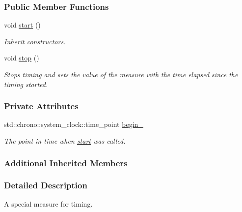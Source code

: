 \subsubsection*{Public Member Functions}
\begin{DoxyCompactItemize}
\item 
void \hyperlink{structslb_1_1core_1_1sb_1_1Timer_a93e96781fce89281c439f6d536e4011b}{start} ()
\begin{DoxyCompactList}\small\item\em Inherit constructors. \end{DoxyCompactList}\item 
void \hyperlink{structslb_1_1core_1_1sb_1_1Timer_a77d5ccada653b8f6a4b18efe0fe81d15}{stop} ()\hypertarget{structslb_1_1core_1_1sb_1_1Timer_a77d5ccada653b8f6a4b18efe0fe81d15}{}\label{structslb_1_1core_1_1sb_1_1Timer_a77d5ccada653b8f6a4b18efe0fe81d15}

\begin{DoxyCompactList}\small\item\em Stops timing and sets the value of the measure with the time elapsed since the timing started. \end{DoxyCompactList}\end{DoxyCompactItemize}
\subsubsection*{Private Attributes}
\begin{DoxyCompactItemize}
\item 
std\+::chrono\+::system\+\_\+clock\+::time\+\_\+point \hyperlink{structslb_1_1core_1_1sb_1_1Timer_a0fd0f8429d0116565b6c521e274a2a59}{begin\+\_\+}\hypertarget{structslb_1_1core_1_1sb_1_1Timer_a0fd0f8429d0116565b6c521e274a2a59}{}\label{structslb_1_1core_1_1sb_1_1Timer_a0fd0f8429d0116565b6c521e274a2a59}

\begin{DoxyCompactList}\small\item\em The point in time when \hyperlink{structslb_1_1core_1_1sb_1_1Timer_a93e96781fce89281c439f6d536e4011b}{start} was called. \end{DoxyCompactList}\end{DoxyCompactItemize}
\subsubsection*{Additional Inherited Members}


\subsubsection{Detailed Description}
A special measure for timing. 

